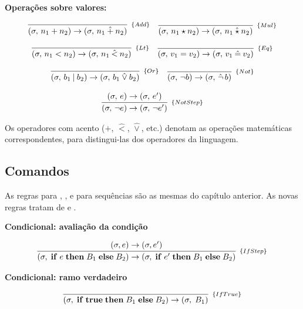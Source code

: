 \textbf{Operações sobre valores:}

\[
  \begin{array}{cc}
    \infer[_{\{Add\}}]{(\sigma,\, n_1 + n_2) \to (\sigma,\, n_1
        \mathbin{\hat{+}}
    n_2)}{}
    &
    \infer[_{\{Mul\}}]{(\sigma,\, n_1 \star n_2) \to (\sigma,\, n_1
    \mathbin{\hat{\star}} n_2)}{}
  \end{array}
\]

\[
  \begin{array}{cc}
    \infer[_{\{Lt\}}]{(\sigma,\, n_1 < n_2) \to (\sigma,\, n_1 \mathbin{\hat{<}}
    n_2)}{}
    &
    \infer[_{\{Eq\}}]{(\sigma,\, v_1 = v_2) \to (\sigma,\, v_1 \mathbin{\hat{=}}
    v_2)}{}
  \end{array}
\]

\[
  \begin{array}{cc}
    \infer[_{\{Or\}}]{(\sigma,\, b_1 \mathbin{|} b_2) \to (\sigma,\, b_1
    \mathbin{\hat{\lor}} b_2)}{}
    &
    \infer[_{\{Not\}}]{(\sigma,\, \neg b) \to (\sigma,\, \hat{\neg}\, b)}{}\\ \\
    \multicolumn{2}{c}{
      \infer[_{\{NotStep\}}]{(\sigma,\, \neg e) \to (\sigma,\, \neg
      e')}{(\sigma,\, e) \to (\sigma,\, e')}
    }
  \end{array}
\]

Os operadores com acento (\(\hat{+}\), \(\hat{<}\), \(\hat{\lor}\),
etc.) denotam as operações matemáticas correspondentes, para
distingui-las dos operadores da linguagem.

\subsection{Comandos}

As regras para ,
,  e
para sequências são as mesmas do capítulo anterior. As novas regras
tratam de  e .

\textbf{Condicional: avaliação da condição}

\[
  \infer[_{\{IfStep\}}]{(\sigma,\; \mathbf{if}\; e\;
    \mathbf{then}\; B_1\; \mathbf{else}\; B_2) \to (\sigma,\;
      \mathbf{if}\; e'\; \mathbf{then}\; B_1\; \mathbf{else}\;
  B_2)}{(\sigma, e) \to (\sigma, e')}
\]

\textbf{Condicional: ramo verdadeiro}

\[
  \infer[_{\{IfTrue\}}]{(\sigma,\; \mathbf{if}\; \mathbf{true}\; \mathbf{then}\;
  B_1\; \mathbf{else}\; B_2) \to (\sigma,\; B_1)}{}
\]

